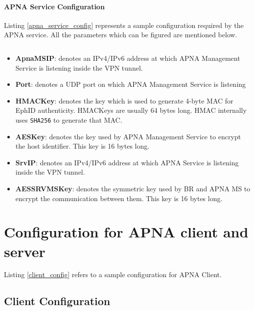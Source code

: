 \paragraph{APNA Service Configuration}
Listing \ref{apna_service_config} represents a sample configuration required by the APNA service. All the parameters which can be figured are mentioned below.
\begin{code}
\inputminted[frame=lines, framesep=2mm, baselinestretch=1.2, fontsize=\footnotesize, breaklines]{json}{code_snippets/apna_srv_config.json} \label{apna_service_config}
\end{code}

\begin{itemize}
    \item \textbf{ApnaMSIP}: denotes an IPv4/IPv6 address at which APNA Management Service is listening inside the VPN tunnel.
    \item \textbf{Port}: denotes a UDP port on which APNA Management Service is listening
    \item \textbf{HMACKey}: denotes the key which is used to generate 4-byte MAC for EphID authenticity. HMACKeys are usually 64 bytes long. HMAC internally uses \texttt{SHA256} to generate that MAC.
    \item \textbf{AESKey}: denotes the key used by APNA Management Service to encrypt the host identifier. This key is 16 bytes long.
    \item \textbf{SrvIP}: denotes an IPv4/IPv6 address at which APNA Service is listening inside the VPN tunnel.
    \item \textbf{AESSRVMSKey}: denotes the symmetric key used by BR and APNA MS to encrypt the communication between them. This key is 16 bytes long.
\end{itemize}

\section{Configuration for APNA client and server}
Listing \ref{client_config} refers to a sample configuration for APNA Client.
\subsection{Client Configuration}
\begin{code}
\inputminted[frame=lines, framesep=2mm, baselinestretch=1.2, fontsize=\footnotesize, breaklines]{json}{code_snippets/client.json} \label{client_config}
\end{code}


